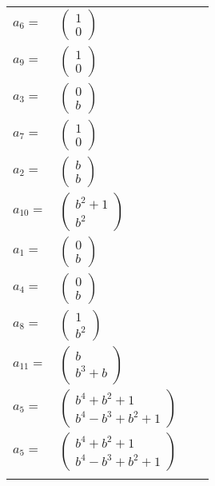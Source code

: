 \documentclass[1p]{elsarticle_modified}
\theoremstyle{definition}
\begin{document}
\begin{tabular}{m{7pt} m{180pt} m{7pt} m{180pt} }
\flushright $a_{6}=$&$\begin{pmatrix}1\\0\end{pmatrix}$ \\
\flushright $a_{9}=$&$\begin{pmatrix}1\\0\end{pmatrix}$ \\
\flushright $a_{3}=$&$\begin{pmatrix}0\\b\end{pmatrix}$ \\
\flushright $a_{7}=$&$\begin{pmatrix}1\\0\end{pmatrix}$ \\
\flushright $a_{2}=$&$\begin{pmatrix}b\\b\end{pmatrix}$ \\
\flushright $a_{10}=$&$\begin{pmatrix}b^2+1\\b^2\end{pmatrix}$ \\
\flushright $a_{1}=$&$\begin{pmatrix}0\\b\end{pmatrix}$ \\
\flushright $a_{4}=$&$\begin{pmatrix}0\\b\end{pmatrix}$ \\
\flushright $a_{8}=$&$\begin{pmatrix}1\\b^2\end{pmatrix}$ \\
\flushright $a_{11}=$&$\begin{pmatrix}b\\b^3+b\end{pmatrix}$ \\
\flushright $a_{5}=$&$\begin{pmatrix}b^4+b^2+1\\b^4- b^3+b^2+1\end{pmatrix}$\\ \flushright $a_{5}=$&$\begin{pmatrix}b^4+b^2+1\\b^4- b^3+b^2+1\end{pmatrix}$\\&\end{tabular}
\end{document}
